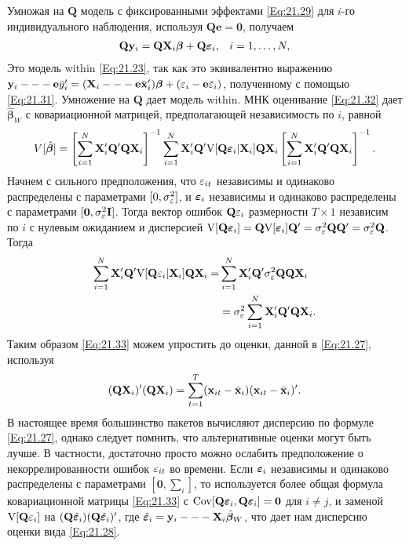 Умножая на $\mathbf Q$ модель с фиксированными эффектами \ref{Eq:21.29} для $i$-го индивидуального наблюдения, используя $\mathbf Q \mathbf e= \mathbf 0$, получаем
\begin{align}
&\mathbf Q \mathbf y_i= \mathbf Q\mathbf  X_i \bm\beta + \mathbf Q \bm{\varepsilon}_i,
&i=1, \dots, N,
\label{Eq:21.32}
\end{align}
Это модель within \ref{Eq:21.23}, так как это эквивалентно выражению $\mathbf y_i --- \mathbf e \bar{y}'_i = (\mathbf X_i --- \mathbf e \bar{\mathbf x}'_i ) \bm\beta + (\varepsilon_i- \mathbf e \bar{\varepsilon}_i)$, полученному с помощью \ref{Eq:21.31}. Умножение на $\mathbf Q$ дает модель within. МНК оценивание \ref{Eq:21.32} дает $\hat{\bm\beta}_W$ с ковариационной матрицей, предполагающей независимость по $i$, равной
\begin{align}
V[\hat{\bm\beta}]=\left[ \sum_{i=1}^N \mathbf X'_i \mathbf Q' \mathbf Q \mathbf X_i \right]^{-1} 
\sum_{i=1}^N \mathbf X'_i \mathbf Q' \mathrm V[\mathbf Q \bm{\varepsilon}_i | \mathbf X_i] \mathbf Q \mathbf X_i 
\left[ \sum_{i=1}^N \mathbf X'_i \mathbf Q' \mathbf Q \mathbf X_i \right]^{-1}.
\label{Eq:21.33}
\end{align}
Начнем с сильного предположения, что $\varepsilon_{it}$ независимы и одинаково распределены с параметрами $[0, \sigma^2_{\varepsilon}]$, и $\bm{\varepsilon}_i$ независимы и одинаково распределены с параметрами $[\mathbf 0, \sigma^2_{\varepsilon} \mathbf I]$. Тогда вектор ошибок $\mathbf Q \mathbf {\varepsilon}_i$ размерности $T \times 1$ независим по $i$ с нулевым ожиданием и дисперсией $\mathrm V[\mathbf Q \bm{\varepsilon}_i]=\mathbf Q \mathrm V[\bm{\varepsilon}_i]\mathbf Q'=\sigma^2_\varepsilon \mathbf Q \mathbf Q' = \sigma^2_\varepsilon \mathbf Q$. Тогда
\begin{align}
\sum_{i=1}^N \mathbf X'_i \mathbf Q' \mathrm V[\mathbf Q \varepsilon_i | \mathbf X_i] \mathbf Q \mathbf X_i=
&\sum_{i=1}^N \mathbf X'_i \mathbf Q' \mathrm \sigma^2_\varepsilon \mathbf Q \mathbf Q \mathbf X_i  \nonumber \\
&=\sigma^2_\varepsilon \sum_{i=1}^N \mathbf X'_i \mathbf Q'  \mathbf Q \mathbf X_i.
\nonumber
\end{align}
Таким образом \ref{Eq:21.33} можем упростить до оценки, данной в \ref{Eq:21.27}, используя
\begin{align}
(\mathbf Q \mathbf X_i)'(\mathbf Q \mathbf X_i)=\sum^T_{t=1}(\mathbf{x}_{it}-\bar{\mathbf{x}}_i)(\mathbf{x}_{it}-\bar{\mathbf{x}}_i)'.
\nonumber
\end{align}
В настоящее время большинство пакетов вычисляют дисперсию по формуле \ref{Eq:21.27}, однако следует помнить, что альтернативные оценки могут быть лучше. В частности, достаточно просто можно ослабить предположение о некоррелированности ошибок $\varepsilon_{it}$ во времени. Если $\bm{\varepsilon}_i$ независимы и одинаково распределены с параметрами $[\mathbf 0, \sum_i]$, то используется более общая формула ковариационной матрицы \ref{Eq:21.33} с $\mathrm{Cov}[\mathbf Q \bm{\varepsilon}_i, \mathbf Q\bm {\varepsilon}_i]= \mathbf 0$ для $i \neq j$, и заменой $\mathrm V[\mathbf Q \mathbf {\varepsilon}_i]$ на $(\mathbf Q  \hat{\bm{\varepsilon}}_i) (\mathbf Q  \hat{\bm{\varepsilon}}_i)'$, где $\hat{\bm{\varepsilon}}_i=\mathbf y_i --- \mathbf X_i \hat{\bm\beta}_W$, что дает нам дисперсию оценки вида \ref{Eq:21.28}.

